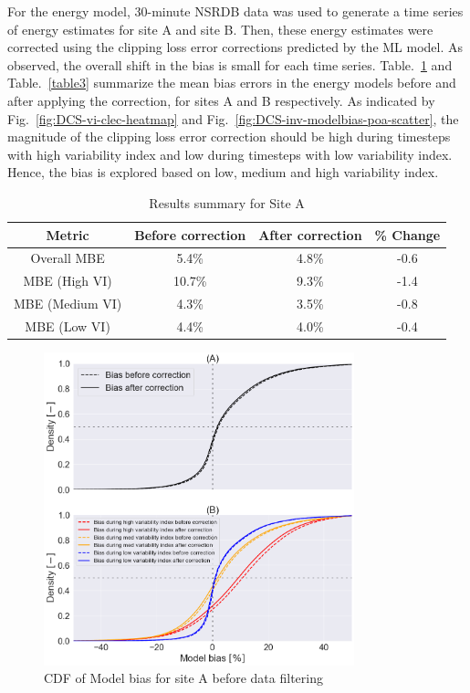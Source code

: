 \documentclass[conference]{IEEEtran}
\begin{document}
For the energy model, 30-minute NSRDB data was used to generate a time series of energy estimates for site A and site B. Then, these energy estimates were corrected using the clipping loss error corrections predicted by the ML model. As observed, the overall shift in the bias is small for each time series. Table.~\ref{table2} and Table.~\ref{table3} summarize the mean bias errors in the energy models before and after applying the correction, for sites A and B respectively. As indicated by Fig.~\ref{fig:DCS-vi-clec-heatmap} and Fig.~\ref{fig:DCS-inv-modelbias-poa-scatter}, the magnitude of the clipping loss error correction should be high during timesteps with high variability index and low during timesteps with low variability index. Hence, the bias is explored based on low, medium and high variability index. 

\begin{table}[htbp]
\caption{Results summary for Site A}
\begin{center}
\begin{tabular}{ |c|c|c|c| } 
\hline
Metric & Before correction & After correction & \% Change\\
\hline
Overall MBE & 5.4\% & 4.8\% & -0.6\\
\hline
MBE (High VI) & 10.7\% & 9.3\% & -1.4\\
\hline
MBE (Medium VI) & 4.3\% & 3.5\% & -0.8 \\
\hline
MBE (Low VI) & 4.4\% & 4.0\% & -0.4\\
\hline
\end{tabular}
\end{center}
\label{table2}
\end{table}


\begin{figure}[htbp]
\centerline{\includegraphics[width=9cm]{DCS_ModelBias_breakdown_CDF_v3.png}}
\caption{CDF of Model bias for site A before data filtering}
\label{fig:DCS-modelbias-cdf}
\end{figure}
\end{document}
